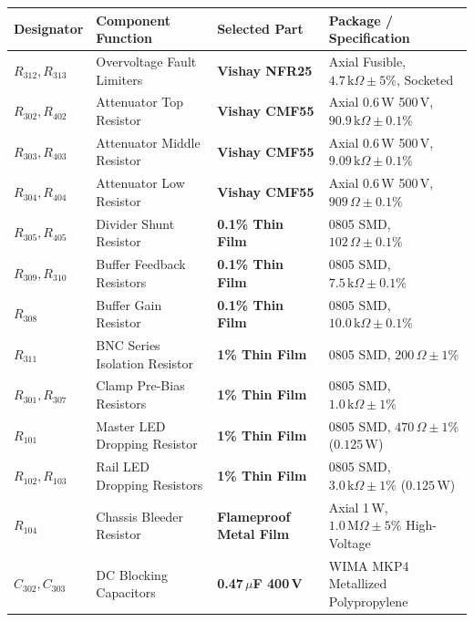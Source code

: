 \documentclass[11pt, letterpaper]{article}
\begin{document}
\begin{table}[H]
    \centering
    \small
    \setlength{\tabcolsep}{3.5pt}
    \begin{tabularx}{\linewidth}{@{} l l l L @{}}
        \toprule
        \textbf{Designator} & \textbf{Component Function} & \textbf{Selected Part} & \textbf{Package / Specification} \\
        \midrule
        $R_{312}, R_{313}$ & Overvoltage Fault Limiters & \textbf{Vishay NFR25} & Axial Fusible, $4.7\,\text{k}\Omega \pm 5\%$, Socketed \\
        $R_{302}, R_{402}$ & Attenuator Top Resistor & \textbf{Vishay CMF55} & Axial 0.6\,W 500\,V, $90.9\,\text{k}\Omega \pm 0.1\%$ \\
        $R_{303}, R_{403}$ & Attenuator Middle Resistor & \textbf{Vishay CMF55} & Axial 0.6\,W 500\,V, $9.09\,\text{k}\Omega \pm 0.1\%$ \\
        $R_{304}, R_{404}$ & Attenuator Low Resistor & \textbf{Vishay CMF55} & Axial 0.6\,W 500\,V, $909\,\Omega \pm 0.1\%$ \\
        $R_{305}, R_{405}$ & Divider Shunt Resistor & \textbf{0.1\% Thin Film} & 0805 SMD, $102\,\Omega \pm 0.1\%$ \\
        $R_{309}, R_{310}$ & Buffer Feedback Resistors & \textbf{0.1\% Thin Film} & 0805 SMD, $7.5\,\text{k}\Omega \pm 0.1\%$ \\
        $R_{308}$ & Buffer Gain Resistor & \textbf{0.1\% Thin Film} & 0805 SMD, $10.0\,\text{k}\Omega \pm 0.1\%$ \\
        $R_{311}$ & BNC Series Isolation Resistor & \textbf{1\% Thin Film} & 0805 SMD, $200\,\Omega \pm 1\%$ \\
        $R_{301}, R_{307}$ & Clamp Pre-Bias Resistors & \textbf{1\% Thin Film} & 0805 SMD, $1.0\,\text{k}\Omega \pm 1\%$ \\
        $R_{101}$ & Master LED Dropping Resistor & \textbf{1\% Thin Film} & 0805 SMD, $470\,\Omega \pm 1\%$ ($0.125\,\text{W}$) \\
        $R_{102}, R_{103}$ & Rail LED Dropping Resistors & \textbf{1\% Thin Film} & 0805 SMD, $3.0\,\text{k}\Omega \pm 1\%$ ($0.125\,\text{W}$) \\
        $R_{104}$ & Chassis Bleeder Resistor & \textbf{Flameproof Metal Film} & Axial 1\,W, $1.0\,\text{M}\Omega \pm 5\%$ High-Voltage \\
        $C_{302}, C_{303}$ & DC Blocking Capacitors & \textbf{0.47\,$\mu$F 400\,V} & WIMA MKP4 Metallized Polypropylene \\

\end{tabularx}
\end{table}
\end{document}
